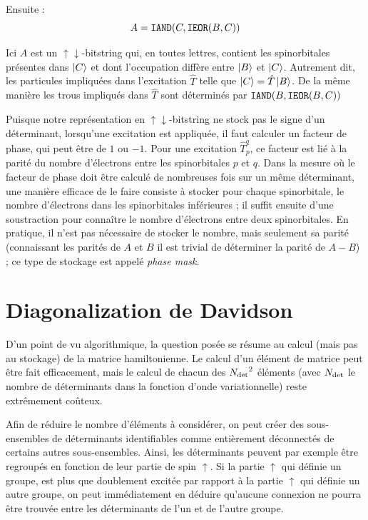 \documentclass[./thesis.tex]{subfiles}
\begin{document}
Ensuite :
\begin{equation}
A = \text{\texttt{IAND}}(C,\text{\texttt{IEOR}}(B,C))
\end{equation}

Ici $A$ est un $\uparrow \downarrow$-bitstring qui, en toutes lettres, contient les spinorbitales présentes dans $\ket C$ et dont l'occupation diffère entre $\ket B$ et $\ket C$. Autrement dit, les particules impliquées dans l'excitation $\hat T$ telle que $\ket C = \hat T \ket B$. De la même manière les trous impliqués dans $\hat T$ sont déterminés par $\text{\texttt{IAND}}(B,\text{\texttt{IEOR}}(B,C))$

Puisque notre représentation en $\uparrow \downarrow$-bitstring ne stock pas le signe d'un déterminant, lorsqu'une excitation est appliquée, il faut calculer un facteur de phase, qui peut être de $1$ ou $-1$. Pour une excitation $\hat T_p^q$, ce facteur est lié à la parité du nombre d'électrons entre les spinorbitales $p$ et $q$. Dans la mesure où le facteur de phase doit être calculé de nombreuses fois sur un même déterminant, une manière efficace de le faire consiste à stocker pour chaque spinorbitale, le nombre d'électrons dans les spinorbitales inférieures ; il suffit ensuite d'une soustraction pour connaître le nombre d'électrons entre deux spinorbitales. En pratique, il n'est pas nécessaire de stocker le nombre, mais seulement sa parité (connaissant les parités de $A$ et $B$ il est trivial de déterminer la parité de $A-B$) ; ce type de stockage est appelé \emph{phase mask}.
\section{Diagonalization de Davidson}

D'un point de vu algorithmique, la question posée se résume au calcul (mais pas au stockage) de la matrice hamiltonienne. Le calcul d'un élément de matrice peut être fait efficacement, mais le calcul de chacun des ${N_\text{det}}^2$ éléments (avec ${N_\text{det}}$ le nombre de déterminants dans la fonction d'onde variationnelle) reste extrêmement coûteux.

Afin de réduire le nombre d'éléments à considérer, on peut créer des sous-ensembles de déterminants identifiables comme entièrement déconnectés de certains autres sous-ensembles. Ainsi, les déterminants peuvent par exemple être regroupés en fonction de leur partie de spin $\uparrow$. Si la partie $\uparrow$ qui définie un groupe, est plus que doublement excitée par rapport à la partie $\uparrow$ qui définie un autre groupe, on peut immédiatement en déduire qu'aucune connexion ne pourra être trouvée entre les déterminants de l'un et de l'autre groupe.
\end{document}
